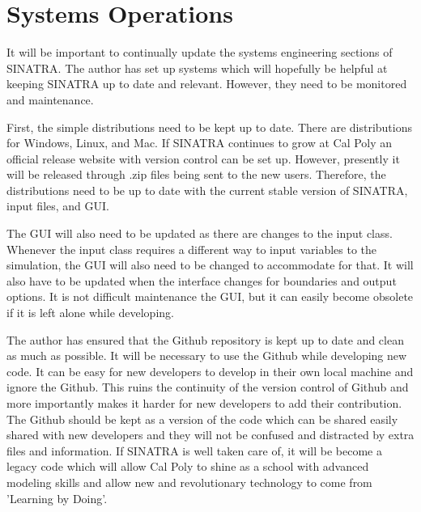 \section{Systems Operations}

It will be important to continually update the systems engineering sections of SINATRA. The author has set up systems which will hopefully be helpful at keeping SINATRA up to date and relevant. However, they need to be monitored and maintenance. \par

\indent First, the simple distributions need to be kept up to date. There are distributions for Windows, Linux, and Mac. If SINATRA continues to grow at Cal Poly an official release website with version control can be set up. However, presently it will be released through .zip files being sent to the new users. Therefore, the distributions need to be up to date with the current stable version of SINATRA, input files, and GUI. \par

\indent The GUI will also need to be updated as there are changes to the input class. Whenever the input class requires a different way to input variables to the simulation, the GUI will also need to be changed to accommodate for that. It will also have to be updated when the interface changes for boundaries and output options. It is not difficult maintenance the GUI, but it can easily become obsolete if it is left alone while developing. \par

\indent The author has ensured that the Github repository is kept up to date and clean as much as possible. It will be necessary to use the Github while developing new code. It can be easy for new developers to develop in their own local machine and ignore the Github. This ruins the continuity of the version control of Github and more importantly makes it harder for new developers to add their contribution. The Github should be kept as a version of the code which can be shared easily shared with new developers and they will not be confused and distracted by extra files and information. If SINATRA is well taken care of, it will be become a legacy code which will allow Cal Poly to shine as a school with advanced modeling skills and allow new and revolutionary technology to come from 'Learning by Doing'.




